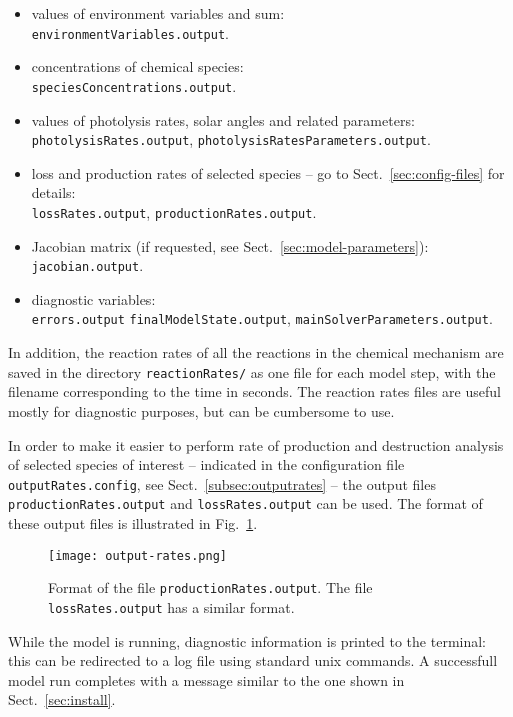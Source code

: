 \begin{itemize}
\item values of environment variables and  sum:\\
  \texttt{environmentVariables.output}.
  \item concentrations of chemical species:\\
  \texttt{speciesConcentrations.output}.
\item values of photolysis rates, solar angles and related parameters:\\
  \texttt{photolysisRates.output},
  \texttt{photolysisRatesParameters.output}.
\item loss and production rates of selected species -- go to
  Sect.~\ref{sec:config-files} for details:\\
  \texttt{lossRates.output},
  \texttt{productionRates.output}.
\item Jacobian matrix (if requested, see Sect.~\ref{sec:model-parameters}):\\
  \texttt{jacobian.output}.
\item diagnostic variables:\\
  \texttt{errors.output}
  \texttt{finalModelState.output},
  \texttt{mainSolverParameters.output}.
\end{itemize}

In addition, the reaction rates of all the reactions in the chemical
mechanism are saved in the directory \texttt{reactionRates/} as one
file for each model step, with the filename corresponding to the time
in seconds. The reaction rates files are useful mostly for diagnostic
purposes, but can be cumbersome to use.

In order to make it easier to perform rate of production and
destruction analysis of selected species of interest -- indicated in
the configuration file \texttt{outputRates.config}, see
Sect.~\ref{subsec:outputrates} -- the output files
\texttt{productionRates.output} and \texttt{lossRates.output} can be
used. The format of these output files is illustrated in
Fig.~\ref{fig:ropa}.

\begin{figure}[htb]
  \centering
  \texttt{[image: output-rates.png]}
  \caption{Format of the file \texttt{productionRates.output}. The file
    \texttt{lossRates.output} has a similar format.} \label{fig:ropa}
\end{figure}

While the model is running, diagnostic information is printed
to the terminal: this can be redirected to a log file using standard
unix commands. A successfull model run completes with a message
similar to the one shown in Sect.~\ref{sec:install}.
